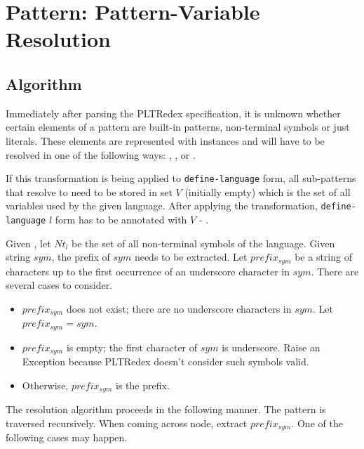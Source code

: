 \section{Pattern: Pattern-Variable Resolution}
\label{section:pv-resolve}

\subsection{Algorithm}

Immediately after parsing the PLTRedex specification, it is unknown whether certain elements of a pattern are built-in patterns, non-terminal symbols or just literals. These elements are represented with \UnresolvedSymbol instances and will have to be resolved in one of the following ways: \BuiltInPatternNoArg, \NonTerminalNoArg, or \LiteralPatternNoArg.

If this transformation is being applied to \texttt{define-language} form, all sub-patterns that resolve to \LiteralPatternNoArg \space need to be stored in set $V$ (initially empty) which is the set of all variables used by the given language. After applying the transformation, \texttt{define-language} $l$ form has to be annotated with $V$ - .

Given , let $\mathit{Nt_{l}}$ be the set of all non-terminal symbols of the language. Given string $\mathit{sym}$, the prefix of $\mathit{sym}$ needs to be extracted. Let $\mathit{prefix_{sym}}$ be a string of characters up to the first occurrence of an underscore character in $\mathit{sym}$. There are several cases to consider.

\begin{itemize}
\item $\mathit{prefix_{sym}}$ does not exist; there are no underscore characters in $\mathit{sym}$. Let $\mathit{prefix_{sym}=sym}$.
\item $\mathit{prefix_{sym}}$ is empty; the first character of $\mathit{sym}$ is underscore. Raise an Exception because PLTRedex doesn't consider such symbols valid.
\item Otherwise, $\mathit{prefix_{sym}}$ is the prefix.
\end{itemize}

The resolution algorithm proceeds in the following manner. The pattern is traversed recursively. When coming across \UnresolvedSymbol \space node, extract $\mathit{prefix_{sym}}$. One of the following cases may happen.

